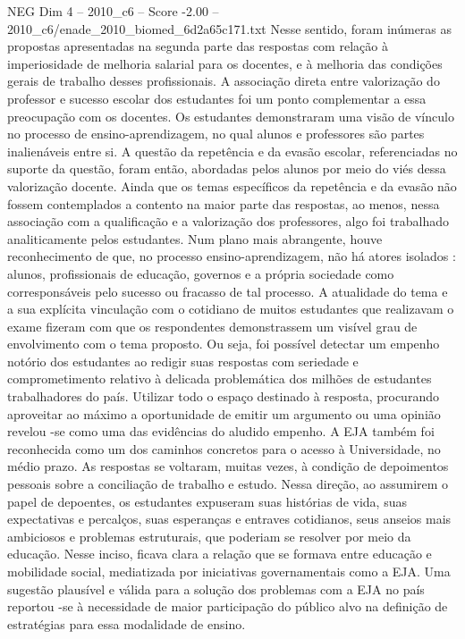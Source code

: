 \begin{textsample}{NEG Dim 4 – 2010\_c6 – Score -2.00 – 2010\_c6/enade\_2010\_biomed\_6d2a65c171.txt}
Nesse sentido, foram inúmeras as propostas apresentadas na segunda parte das respostas com relação à imperiosidade de melhoria salarial para os docentes, e à melhoria das condições gerais de trabalho desses profissionais.
A associação direta entre valorização do professor e sucesso escolar dos estudantes foi um ponto complementar a essa preocupação com os docentes.
Os estudantes demonstraram uma visão de vínculo no processo de ensino-aprendizagem, no qual alunos e professores são partes inalienáveis entre si.
A questão da repetência e da evasão escolar, referenciadas no suporte da questão, foram então, abordadas pelos alunos por meio do viés dessa valorização docente.
Ainda que os temas específicos da repetência e da evasão não fossem contemplados a contento na maior parte das respostas, ao menos, nessa associação com a qualificação e a valorização dos professores, algo foi trabalhado analiticamente pelos estudantes.
Num plano mais abrangente, houve reconhecimento de que, no processo ensino-aprendizagem, não há atores isolados : alunos, profissionais de educação, governos e a própria sociedade como corresponsáveis pelo sucesso ou fracasso de tal processo.
A atualidade do tema e a sua explícita vinculação com o cotidiano de muitos estudantes que realizavam o exame fizeram com que os respondentes demonstrassem um visível grau de envolvimento com o tema proposto.
Ou seja, foi possível detectar um empenho notório dos estudantes ao redigir suas respostas com seriedade e comprometimento relativo à delicada problemática dos milhões de estudantes trabalhadores do país.
Utilizar todo o espaço destinado à resposta, procurando aproveitar ao máximo a oportunidade de emitir um argumento ou uma opinião revelou -se como uma das evidências do aludido empenho.
A EJA também foi reconhecida como um dos caminhos concretos para o acesso à Universidade, no médio prazo.
As respostas se voltaram, muitas vezes, à condição de depoimentos pessoais sobre a conciliação de trabalho e estudo.
Nessa direção, ao assumirem o papel de depoentes, os estudantes expuseram suas histórias de vida, suas expectativas e percalços, suas esperanças e entraves cotidianos, seus anseios mais ambiciosos e problemas estruturais, que poderiam se resolver por meio da educação.
Nesse inciso, ficava clara a relação que se formava entre educação e mobilidade social, mediatizada por iniciativas governamentais como a EJA.
Uma sugestão plausível e válida para a solução dos problemas com a EJA no país reportou -se à necessidade de maior participação do público alvo na definição de estratégias para essa modalidade de ensino.

\end{textsample}
